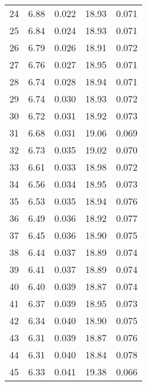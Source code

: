 \begin{table}
\begin{tabular}{c|ll|ll}
24 & 6.88 & 0.022 & 18.93 & 0.071 \\
25 & 6.84 & 0.024 & 18.93 & 0.071 \\
26 & 6.79 & 0.026 & 18.91 & 0.072 \\
27 & 6.76 & 0.027 & 18.95 & 0.071 \\
28 & 6.74 & 0.028 & 18.94 & 0.071 \\
29 & 6.74 & 0.030 & 18.93 & 0.072 \\
30 & 6.72 & 0.031 & 18.92 & 0.073 \\
31 & 6.68 & 0.031 & 19.06 & 0.069 \\
32 & 6.73 & 0.035 & 19.02 & 0.070 \\
33 & 6.61 & 0.033 & 18.98 & 0.072 \\
34 & 6.56 & 0.034 & 18.95 & 0.073 \\
35 & 6.53 & 0.035 & 18.94 & 0.076 \\
36 & 6.49 & 0.036 & 18.92 & 0.077 \\
37 & 6.45 & 0.036 & 18.90 & 0.075 \\
38 & 6.44 & 0.037 & 18.89 & 0.074 \\
39 & 6.41 & 0.037 & 18.89 & 0.074 \\
40 & 6.40 & 0.039 & 18.87 & 0.074 \\
41 & 6.37 & 0.039 & 18.95 & 0.073 \\
42 & 6.34 & 0.040 & 18.90 & 0.075 \\
43 & 6.31 & 0.039 & 18.87 & 0.076 \\
44 & 6.31 & 0.040 & 18.84 & 0.078 \\
45 & 6.33 & 0.041 & 19.38 & 0.066 \\
               \hline
        \end{tabular}
    \end{table}
    \clearpage

